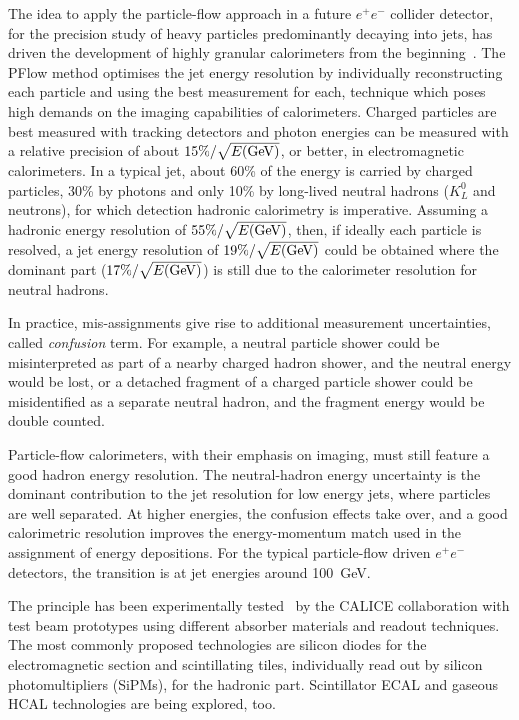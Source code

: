 The idea to apply the particle-flow approach in a future $e^+e^-$ collider detector, for the precision study of heavy particles predominantly decaying into jets, has driven the development of highly granular calorimeters from the beginning~\cite{Brient:2002gh,Morgunov:2001cd}. 
The PFlow method optimises the jet energy resolution by individually reconstructing each particle and using the best measurement for each, technique which poses high demands on the imaging capabilities of calorimeters.
Charged particles are best measured with tracking detectors and photon energies can be measured with a relative precision of about $15\%/\sqrt{E(\rm{GeV})}$, or better, in electromagnetic calorimeters. 
In a typical jet, about 60\% of the energy is carried by charged particles, 30\% by photons and only 10\% by long-lived neutral hadrons ($K^0_L$ and neutrons), for which detection hadronic calorimetry is imperative. 
Assuming a hadronic energy resolution of $55\%/\sqrt{E(\rm{GeV})}$, then, if ideally each particle is resolved, a jet energy resolution of $19\%/\sqrt{E(\rm{GeV})}$ could be obtained where the dominant part ($17\%/\sqrt{E(\rm{GeV})}$) is still due to the calorimeter resolution for neutral hadrons.

In practice, mis-assignments give rise to additional measurement uncertainties, called {\it confusion} term. 
For example, a neutral particle shower could be misinterpreted as part of a nearby charged hadron shower, and the neutral energy would be lost, or a detached fragment of a charged particle shower could be misidentified as a separate neutral hadron, and the fragment energy would be double counted. 

Particle-flow calorimeters, with their emphasis on imaging, must still feature a good hadron energy resolution.  The neutral-hadron energy uncertainty is the dominant contribution to the jet resolution for low energy jets, where particles are well separated. At higher energies, the confusion effects take over, and a good calorimetric resolution improves the energy-momentum match used in the assignment of energy depositions. For the typical particle-flow driven $e^+e^-$ detectors, the transition is at jet energies around 100~GeV.

The principle has been experimentally tested~\cite{Sefkow:2015hna} by the CALICE collaboration with test beam prototypes using different absorber materials and readout techniques. 
The most commonly proposed technologies are silicon diodes for the electromagnetic section and scintillating tiles, individually read out by silicon photomultipliers (SiPMs), for the hadronic part. 
Scintillator ECAL and gaseous HCAL technologies are being explored, too.

